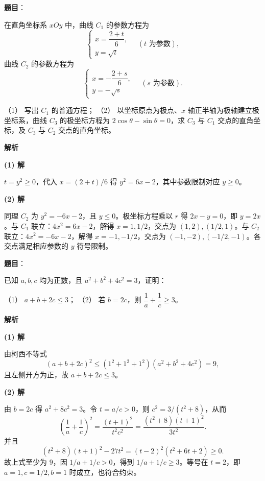 \begin{answer}

\textbf{题目}：

在直角坐标系 $xOy$ 中，曲线 $C_1$ 的参数方程为
\nopagebreak[4]
\[
\begin{cases}
x=\dfrac{2+t}{6},\\
y=\sqrt t
\end{cases}\quad(t\text{ 为参数}),
\]
曲线 $C_2$ 的参数方程为
\nopagebreak[4]
\[
\begin{cases}
x=-\dfrac{2+s}{6},\\
y=-\sqrt s
\end{cases}\quad(s\text{ 为参数}).
\]

（1） 写出 $C_1$ 的普通方程；  
（2） 以坐标原点为极点、$x$ 轴正半轴为极轴建立极坐标系，曲线 $C_3$ 的极坐标方程为 $2\cos\theta-\sin\theta=0$，求 $C_3$ 与 $C_1$ 交点的直角坐标，及 $C_3$ 与 $C_2$ 交点的直角坐标。

\textbf{解析}

\textbf{(1) 解}

$t=y^2\ge0$，代入 $x=(2+t)/6$ 得 $y^2=6x-2$，其中参数限制对应 $y\ge0$。

\textbf{(2) 解}

同理 $C_2$ 为 $y^2=-6x-2$，且 $y\le0$。极坐标方程乘以 $r$ 得 $2x-y=0$，即 $y=2x$。与 $C_1$ 联立：$4x^2=6x-2$，解得 $x=1,1/2$，交点为 $(1,2),(1/2,1)$。与 $C_2$ 联立：$4x^2=-6x-2$，解得 $x=-1,-1/2$，交点为 $(-1,-2),(-1/2,-1)$。各交点满足相应参数的 $y$ 符号限制。



\end{answer}
\begin{answer}

\textbf{题目}：

已知 $a,b,c$ 均为正数，且 $a^2+b^2+4c^2=3$，证明：

（1） $a+b+2c\le3$；  
（2） 若 $b=2c$，则 $\dfrac1a+\dfrac1c\ge3$。

\textbf{解析}

\textbf{(1) 解}

由柯西不等式
\nopagebreak[4]
\[
(a+b+2c)^2\le(1^2+1^2+1^2)(a^2+b^2+4c^2)=9,
\]
且左侧开方为正，故 $a+b+2c\le3$。

\textbf{(2) 解}

由 $b=2c$ 得 $a^2+8c^2=3$。令 $t=a/c>0$，则 $c^2=3/(t^2+8)$，从而
\nopagebreak[4]
\[
\left(\frac1a+\frac1c\right)^2
=\frac{(t+1)^2}{t^2c^2}
=\frac{(t^2+8)(t+1)^2}{3t^2}.
\]
并且
\nopagebreak[4]
\[
(t^2+8)(t+1)^2-27t^2=(t-2)^2(t^2+6t+2)\ge0.
\]
故上式至少为 $9$，因 $1/a+1/c>0$，得到 $1/a+1/c\ge3$。等号在 $t=2$，即 $a=1,c=1/2,b=1$ 时成立，也符合约束。



\end{answer}